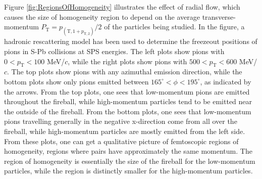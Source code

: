 Figure \ref{fig:RegionsOfHomogeneity} illustrates the effect of radial flow, which causes the size of homogeneity region to depend on the average transverse-momentum $P_\mathrm{T} = p_(\mathrm{T,1} + p_\mathrm{T,2})/2$ of the particles being studied.
In the figure, a hadronic rescattering model \cite{Humanic:2005ye} has been used to determine the freezeout positions of pions in S-Pb collisions at SPS energies.
The left plots show pions with $0 < p_\mathrm{T} < 100$ MeV/$c$, while the right plots show pions with $500 < p_\mathrm{T} < 600$ MeV/$c$.
The top plots show pions with any azimuthal emission direction, while the bottom plots show only pions emitted between $165^\circ < \phi < 195^\circ$, as indicated by the arrows.
From the top plots, one sees that low-momentum pions are emitted throughout the fireball, while high-momentum particles tend to be emitted near the outside of the fireball.
From the bottom plots, one sees that low-momentum pions travelling generally in the negative x-direction come from all over the fireball, while high-momentum particles are mostly emitted from the left side.
From these plots, one can get a qualitative picture of femtoscopic regions of homogeneity, regions where pairs have approximately the same momentum.
The region of homogeneity is essentially the size of the fireball for the low-momentum particles, while the region is distinctly smaller for the high-momentum particles.

